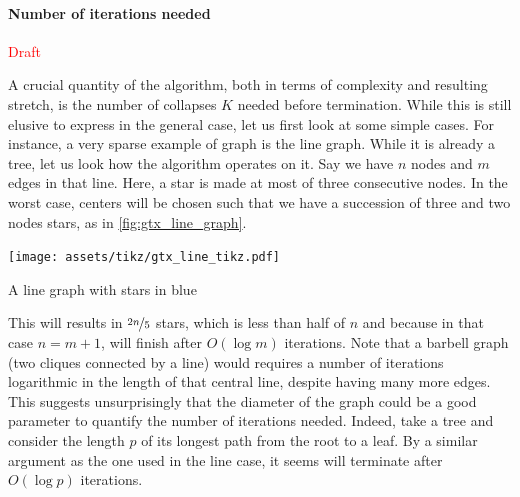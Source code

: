 \paragraph{Number of iterations needed}\label{par:number_of_iteration}%

\textcolor{red}{\LARGE Draft}

A crucial quantity of the \gtx{} algorithm, both in terms of complexity and resulting stretch, is
the number of collapses $K$ needed before termination. While this is still elusive to express in the
general case, let us first look at some simple cases. For instance, a very sparse example of graph
is the line graph. While it is already a tree, let us look how the \gtx{} algorithm operates on it.
Say we have $n$ nodes and $m$ edges in that line. Here, a star is made at most of three
consecutive nodes. In the worst case, centers will be chosen such that we have a succession of three
and two nodes stars, as in \autoref{fig:gtx_line_graph}.%
\begin{marginfigure}
  \centering
  \texttt{[image: assets/tikz/gtx\_line\_tikz.pdf]}
  \caption{A line graph with stars in blue}
  \label{fig:gtx_line_graph}
\end{marginfigure}
This will results in $\nicefrac{2n}{5}$ stars, which is less than half of $n$ and because in that
case $n=m+1$, \gtx{} will finish after $O(\log m)$ iterations. Note that a barbell graph (two
cliques connected by a line) would requires a number of iterations logarithmic in the length of that
central line, despite having many more edges. This suggests unsurprisingly that the diameter of the graph
could be a good parameter to quantify the number of iterations needed. Indeed, take a tree and consider
the length $p$ of its longest path from the root to a leaf. By a similar argument as the one used in
the line case, it seems \gtx{} will terminate after $O(\log p)$ iterations.

